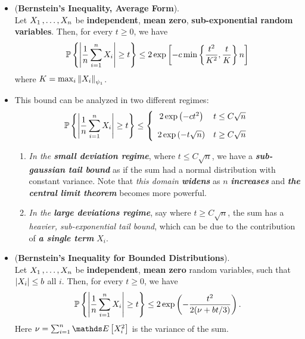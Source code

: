 \documentclass[11pt]{article}
\begin{document}
\begin{itemize}
\item \begin{corollary}(\textbf{Bernstein's Inequality, Average Form}).  \citep{vershynin2018high}\\
Let $X_1 \,{,}\ldots{,}\, X_n$ be \textbf{independent}, \textbf{mean zero}, \textbf{sub-exponential random variables}. Then, for every $t \ge 0$, we have
\begin{align}
{\mathbb P}\left\{\left\lvert \frac{1}{n}\sum_{i=1}^{n}X_i \right\rvert \ge t\right\} \le 2 \exp\left[- c \min\left\{\frac{t^2}{K^2},  \frac{t}{K}\right\}n\right] \label{ineqn: bernstein_inequality_average}
\end{align} where $K = \max_i \left\|X_i\right\|_{\psi_1}$.
\end{corollary}

\item \begin{remark} This bound can be analyzed in two different regimes:
\begin{align*}
{\mathbb P}\left\{\left\lvert \frac{1}{n}\sum_{i=1}^{n}X_i \right\rvert \ge t\right\} \le \left\{\begin{array}{cc}
2 \exp\left(- c t^2\right) &  t\le C \sqrt{n}\\[10pt]
2 \exp\left(-  t\sqrt{n}\right) &  t\ge C \sqrt{n}
\end{array} 
\right. 
\end{align*} 
\begin{enumerate}
\item \emph{In the \textbf{small deviation regime}}, where $t\le C \sqrt{n}$, we have a \emph{\textbf{sub-gaussian tail bound}} as if the sum had a normal distribution with constant variance. Note that \emph{this domain \textbf{widens}} as $n$ \emph{\textbf{increases}} and \emph{\textbf{the central limit theorem}} becomes more powerful. 

\item \emph{In the \textbf{large deviations regime}}, say where $t\ge C \sqrt{n}$, the sum has a \emph{heavier, sub-exponential tail bound}, which can be due to the contribution of \emph{\textbf{a single term}} $X_i$. 
\end{enumerate}
\end{remark}

\item \begin{proposition} (\textbf{Bernstein's Inequality for Bounded Distributions}).  \citep{vershynin2018high}\\
Let $X_1 \,{,}\ldots{,}\, X_n$ be \textbf{independent}, \textbf{mean zero} random variables, such that $\left\lvert X_i \right\rvert \le b$ all $i$. Then, for every $t \ge 0$, we have
\begin{align}
{\mathbb P}\left\{\left\lvert \frac{1}{n}\sum_{i=1}^{n}X_i \right\rvert \ge t\right\} \le 2\exp\left(- \frac{t^2}{2(\nu + bt/3)}\right). \label{ineqn: bernstein_inequality_bounded}
\end{align}
Here $\nu = \sum_{i=1}^{n}\E{}{X_i^2}$ is the variance of the sum.
\end{proposition}


\end{itemize}
\end{document}
